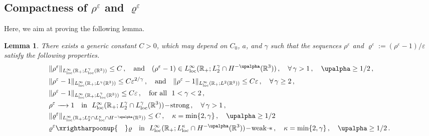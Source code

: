 \documentclass[11pt,reqno]{amsart}
\newtheorem{lemma}{Lemma}
\def \R{{\mathbb{R}}}
\begin{document}

\subsection{Compactness of $\rho^\varepsilon $ and  $\varrho^\varepsilon $ }
Here, we aim at proving the following lemma.
\begin{lemma}
  \label{lem:cv-rho-R}
  There exists a generic constant $C>0$, which may depend on $C_0$,  $a$, and $\gamma$ such that the sequences ${\rho^\varepsilon}$ and  $\varrho^\varepsilon:=(\rho^\varepsilon -1)/\varepsilon$ satisfy the following properties.
  \begin{align*}
    &\| \rho^\varepsilon \|_{ L_{\rm loc}^\infty(\R_+; L_{\rm loc }^\gamma(\R^3))} \leq C\,,
    \quad {\rm and} \quad (\rho^\varepsilon -1) \in L_{\rm loc}^\infty(\R_+; L_2^\gamma \cap H^{-\upalpha}(\R^3))\,, \quad \forall \,\gamma>1 \,, \quad \upalpha \geq 1/2\,,\\
    &\| \rho^\varepsilon -1\|_{ L_{\rm loc}^\infty(\R_+; L^\gamma(\R^3))} \leq  C \varepsilon^{2/\gamma}\,,
    \quad {\rm and} \quad  \| \rho^\varepsilon -1\|_{ L_{\rm loc}^\infty(\R_+; L^2(\R^3))} \leq  C \varepsilon\,,
     \quad \forall\, \gamma \geq 2\,, \\
    & \| \rho^\varepsilon -1\|_{ L_{\rm loc}^\infty(\R_+; L_{\rm loc}^\gamma(\R^3))} \leq  C \varepsilon\,, \quad {\rm for} \ {\rm all } \ \  1<\gamma <2\,,\\
    & \rho^\varepsilon \xrightarrow{\quad} 1 \ \ \mbox{ \rm in } \  L_{\rm loc}^\infty(\R_+; L_2^\gamma \cap  L_{\rm loc}^\gamma(\R^3))\!-\!\mbox{\rm strong}\,, \quad  \forall\, \gamma >1\,,\\
    &  \| \varrho^\varepsilon \|_{ L_{\rm loc}^\infty(\R_+; L_2^\kappa\cap L_{\rm loc }^\kappa\cap H^{-\upalpha}(\R^3))} \leq C\,, 
    \quad \kappa=\min\{2,\gamma\} \,, \quad \upalpha\geq 1/2\\ 
    & \varrho^\varepsilon \xrightharpoonup{\quad} \varrho\ \  \mbox{ \rm in } \  L_{\rm loc}^\infty(\R_+; L_{\rm loc }^\kappa \cap H^{-\upalpha}(\R^3))\!-\!\mbox{\rm weak--}\!\ast\,,  \quad \kappa=\min\{2,\gamma\} \,, \quad \upalpha\geq 1/2\,.
  \end{align*}
\end{lemma}
\end{document}
